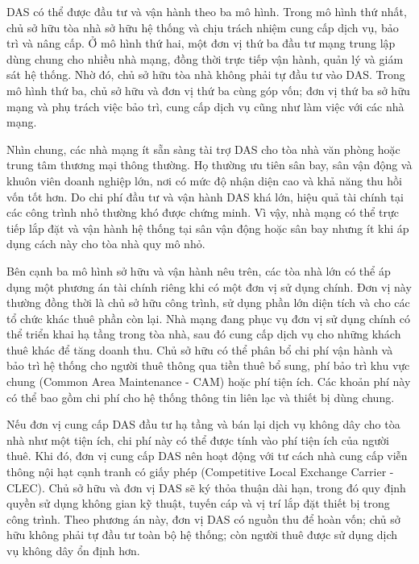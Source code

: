 \documentclass{thesis}
\begin{document}
DAS có thể được đầu tư và vận hành theo ba mô hình. Trong mô hình thứ
nhất, chủ sở hữu tòa nhà sở hữu hệ thống và chịu trách nhiệm cung cấp
dịch vụ, bảo trì và nâng cấp. Ở mô hình thứ hai, một đơn vị thứ ba
đầu tư mạng trung lập dùng chung cho nhiều nhà mạng, đồng thời trực
tiếp vận hành, quản lý và giám sát hệ thống. Nhờ đó, chủ sở hữu tòa
nhà không phải tự đầu tư vào DAS. Trong mô hình thứ ba, chủ sở hữu và
đơn vị thứ ba cùng góp vốn; đơn vị thứ ba sở hữu mạng và phụ trách
việc bảo trì, cung cấp dịch vụ cũng như làm việc với các nhà mạng.

Nhìn chung, các nhà mạng ít sẵn sàng tài trợ DAS cho tòa nhà văn
phòng hoặc trung tâm thương mại thông thường. Họ thường ưu tiên sân
bay, sân vận động và khuôn viên doanh nghiệp lớn, nơi có mức độ nhận
diện cao và khả năng thu hồi vốn tốt hơn. Do chi phí đầu tư và vận
hành DAS khá lớn, hiệu quả tài chính tại các công trình nhỏ thường
khó được chứng minh. Vì vậy, nhà mạng có thể trực tiếp lắp đặt và vận
hành hệ thống tại sân vận động hoặc sân bay nhưng ít khi áp dụng cách
này cho tòa nhà quy mô nhỏ.

Bên cạnh ba mô hình sở hữu và vận hành nêu trên, các tòa nhà lớn có
thể áp dụng một phương án tài chính riêng khi có một đơn vị sử dụng
chính. Đơn vị này thường đồng thời là chủ sở hữu công trình, sử dụng
phần lớn diện tích và cho các tổ chức khác thuê phần còn lại. Nhà
mạng đang phục vụ đơn vị sử dụng chính có thể triển khai hạ tầng
trong tòa nhà, sau đó cung cấp dịch vụ cho những khách thuê khác để
tăng doanh thu. Chủ sở hữu có thể phân bổ chi phí vận hành và bảo trì
hệ thống cho người thuê thông qua tiền thuê bổ sung, phí bảo trì khu
vực chung (Common Area Maintenance - CAM) hoặc phí tiện ích. Các
khoản phí này có thể bao gồm
chi phí cho hệ thống thông tin liên lạc và thiết bị dùng chung.

Nếu đơn vị cung cấp DAS đầu tư hạ tầng và bán lại dịch vụ không dây
cho tòa nhà như một tiện ích, chi phí này có thể được tính vào phí
tiện ích của người thuê. Khi đó, đơn vị cung cấp DAS nên hoạt động
với tư cách nhà cung cấp viễn thông nội hạt cạnh tranh có giấy phép
(Competitive Local Exchange Carrier - CLEC). Chủ sở hữu và đơn vị DAS
sẽ ký thỏa thuận dài hạn, trong đó
quy định quyền sử dụng không gian kỹ thuật, tuyến cáp và vị trí lắp
đặt thiết bị trong công trình. Theo phương án này, đơn vị DAS có
nguồn thu để hoàn vốn; chủ sở hữu không phải tự đầu tư toàn bộ hệ
thống; còn người thuê được sử dụng dịch vụ không dây ổn định hơn.

\end{document}
